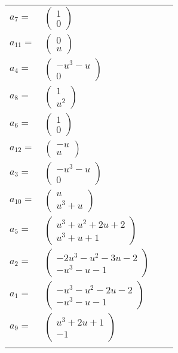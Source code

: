 \documentclass[1p]{elsarticle_modified}
\theoremstyle{definition}
\begin{document}
\begin{tabular}{m{7pt} m{180pt} m{7pt} m{180pt} }
\flushright $a_{7}=$&$\begin{pmatrix}1\\0\end{pmatrix}$ \\
\flushright $a_{11}=$&$\begin{pmatrix}0\\u\end{pmatrix}$ \\
\flushright $a_{4}=$&$\begin{pmatrix}- u^3- u\\0\end{pmatrix}$ \\
\flushright $a_{8}=$&$\begin{pmatrix}1\\u^2\end{pmatrix}$ \\
\flushright $a_{6}=$&$\begin{pmatrix}1\\0\end{pmatrix}$ \\
\flushright $a_{12}=$&$\begin{pmatrix}- u\\u\end{pmatrix}$ \\
\flushright $a_{3}=$&$\begin{pmatrix}- u^3- u\\0\end{pmatrix}$ \\
\flushright $a_{10}=$&$\begin{pmatrix}u\\u^3+u\end{pmatrix}$ \\
\flushright $a_{5}=$&$\begin{pmatrix}u^3+u^2+2 u+2\\u^3+u+1\end{pmatrix}$ \\
\flushright $a_{2}=$&$\begin{pmatrix}-2 u^3- u^2-3 u-2\\- u^3- u-1\end{pmatrix}$ \\
\flushright $a_{1}=$&$\begin{pmatrix}- u^3- u^2-2 u-2\\- u^3- u-1\end{pmatrix}$ \\
\flushright $a_{9}=$&$\begin{pmatrix}u^3+2 u+1\\-1\end{pmatrix}$\\&\end{tabular}
\end{document}
